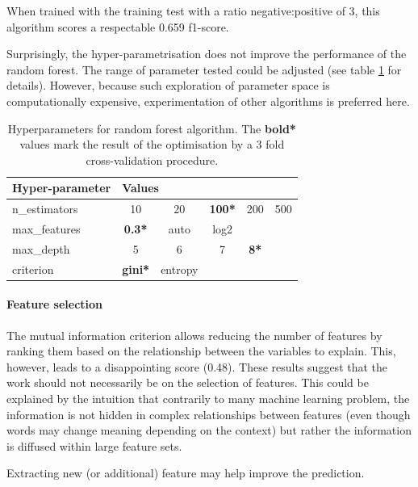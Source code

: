 \documentclass[a4paper, justified]{tufte-handout}
\begin{document}
\begin{fullwidth}
When trained with the training test with a ratio negative:positive of 3, this algorithm scores a respectable 0.659 f1-score.

Surprisingly, the hyper-parametrisation does not improve the performance of the random forest. The range of parameter tested could be adjusted (see table \ref{RF-HP} for details). However, because such exploration of parameter space is computationally expensive, experimentation of other algorithms is preferred here.

\begin{table}[]\label{RF-HP}
\begin{tabular}{l|ccccc}
Hyper-parameter & \multicolumn{5}{l}{Values}                                  \\ \hline
n\_estimators   & 10             & 20      & \textbf{100*} & 200         & 500 \\
max\_features   & \textbf{0.3*}  & auto    & log2          &             &     \\
max\_depth      & 5              & 6       & 7             & \textbf{8*} &     \\
criterion       & \textbf{gini*} & entropy &               &             &     \\ 
\end{tabular}
\caption{Hyperparameters for random forest algorithm. The \textbf{bold*} values mark the result of the optimisation by a 3 fold cross-validation procedure.}
\end{table}


\paragraph{Feature selection}

The mutual information criterion allows reducing the number of features by ranking them based on the relationship between the variables to explain. This, however, leads to a disappointing score (0.48). These results suggest that the work should not necessarily be on the selection of features. This could be explained by the intuition that contrarily to many machine learning problem, the information is not hidden in complex relationships between features (even though words may change meaning depending on the context) but rather the information is diffused within large feature sets.

Extracting new (or additional) feature may help improve the prediction. 


\end{fullwidth}
\end{document}

